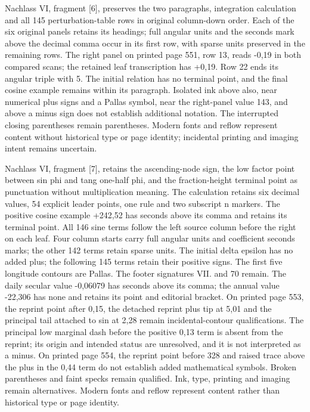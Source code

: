 Nachlass VI, fragment [6], preserves the two paragraphs, integration calculation and all 145 perturbation-table rows in original column-down order. Each of the six original panels retains its headings; full angular units and the seconds mark above the decimal comma occur in its first row, with sparse units preserved in the remaining rows. The right panel on printed page 551, row 13, reads -0,19 in both compared scans; the retained leaf transcription has +0,19. Row 22 ends its angular triple with 5. The initial relation has no terminal point, and the final cosine example remains within its paragraph. Isolated ink above also, near numerical plus signs and a Pallas symbol, near the right-panel value 143, and above a minus sign does not establish additional notation. The interrupted closing parentheses remain parentheses. Modern fonts and reflow represent content without historical type or page identity; incidental printing and imaging intent remains uncertain.

Nachlass VI, fragment [7], retains the ascending-node sign, the low factor point between sin phi and tang one-half phi, and the fraction-height terminal point as punctuation without multiplication meaning. The calculation retains six decimal values, 54 explicit leader points, one rule and two subscript n markers. The positive cosine example +242,52 has seconds above its comma and retains its terminal point. All 146 sine terms follow the left source column before the right on each leaf. Four column starts carry full angular units and coefficient seconds marks; the other 142 terms retain sparse units. The initial delta epsilon has no added plus; the following 145 terms retain their positive signs. The first five longitude contours are Pallas. The footer signatures VII. and 70 remain. The daily secular value -0,06079 has seconds above its comma; the annual value -22,306 has none and retains its point and editorial bracket. On printed page 553, the reprint point after 0,15, the detached reprint plus tip at 5,01 and the principal tail attached to sin at 2,28 remain incidental-contour qualifications. The principal low marginal dash before the positive 0,13 term is absent from the reprint; its origin and intended status are unresolved, and it is not interpreted as a minus. On printed page 554, the reprint point before 328 and raised trace above the plus in the 0,44 term do not establish added mathematical symbols. Broken parentheses and faint specks remain qualified. Ink, type, printing and imaging remain alternatives. Modern fonts and reflow represent content rather than historical type or page identity.

